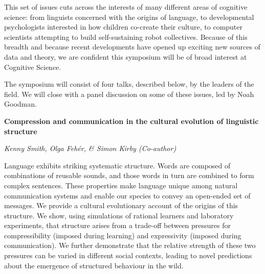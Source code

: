 \documentclass[10pt,letterpaper]{article}
\begin{document}
This set of issues cuts across the interests of many different areas of cognitive science: from linguists concerned with the origins of language, to developmental psychologists interested in how children co-create their culture, to computer scientists attempting to build self-sustaining robot collectives. 
Because of this breadth and because recent developments have opened up exciting new sources of data and theory, we are confident this symposium will be of broad interest at Cognitive Science.

The symposium will consist of four talks, described below, by the leaders of the field.
We will close with a panel discussion on some of these issues, led by Noah Goodman.


\begin{center}\textbf{Compression and communication in the cultural evolution of linguistic structure}\end{center}
\begin{center}\emph{Kenny Smith, Olga Feh\'er, \& Simon Kirby (Co-author)}\end{center}

Language exhibits striking systematic structure. Words are composed of combinations of reusable sounds, and those words in turn are combined to form complex sentences. These properties make language unique among natural communication systems and enable our species to convey an open-ended set of messages.  We provide a cultural evolutionary account of the origins of this structure. We show, using simulations of rational learners and laboratory experiments, that structure arises from a trade-off between pressures for compressibility (imposed during learning) and expressivity (imposed during communication). We further demonstrate that the relative strength of these two pressures can be varied in different social contexts, leading to novel predictions about the emergence of structured behaviour in the wild.
\end{document}
